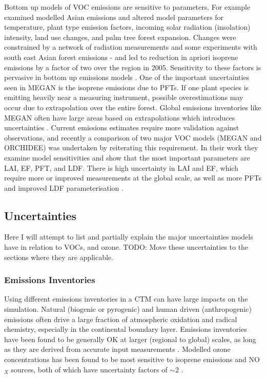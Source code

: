     Bottom up models of VOC emissions are sensitive to parameters.
    For example \textcite{Stavrakou2014} examined modelled Asian emissions and altered model parameters for temperature, plant type emission factors, incoming solar radiation (insolation) intensity, land use changes, and palm tree forest expansion.
    Changes were constrained by a network of radiation measurements and some experiments with south east Asian forest emissions - and led to reduction in apriori isoprene emissions by a factor of two over the region in 2005.
    Sensitivity to these factors is pervasive in bottom up emissions models \parencite[eg.][]{Marais2014,Miller2014,Messina2016}.
    One of the important uncertainties seen in MEGAN is the isoprene emissions due to PFTs.
    If one plant species is emitting heavily near a measuring instrument, possible overestimations may occur due to extrapolation over the entire forest.
    Global emissions inventories like MEGAN often have large areas based on extrapolations which introduces uncertainties \parencite{Miller2014}.
    Current emissions estimates require more validation against observations, and recently a comparison of two major VOC models (MEGAN and ORCHIDEE) was undertaken by \textcite{Messina2016} reiterating this requirement.
    In their work they examine model sensitivities and show that the most important parameters are LAI, EF, PFT, and LDF.
    There is high uncertainty in LAI and EF, which require more or improved measurements at the global scale, as well as more PFTs and improved LDF parameterisation \parencite{Messina2016}.
    
  
  \subsection{Uncertainties}
  \label{LR:Models:Uncert}
    
    Here I will attempt to list and partially explain the major uncertainties models have in relation to  VOCs, and ozone. 
    TODO: Move these uncertainties to the sections where they are applicable.
    
    
    \subsubsection{Emissions Inventories}
      Using different emissions inventories in a CTM can have large impacts on the simulation.
      Natural (biogenic or pyrogenic) and human driven (anthropogenic) emissions often drive a large fraction of atmospheric oxidation and radical chemistry, especially in the continental boundary layer.
      Emissions inventories have been found to be generally OK at larger (regional to global) scales, as long as they are derived from accurate input measurements \parencite{Zeng2015}.
      Modelled ozone concentrations has been found to be most sensitive to isoprene emissions and NO$_X$ sources, both of which have uncertainty factors of $\sim 2$ \parencite{Christian2017}.
      
